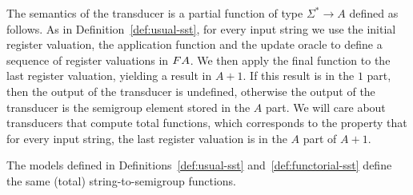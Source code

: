 The semantics of the transducer is a partial function of type 
$\Sigma^* \to A$ defined as follows. As in Definition~\ref{def:usual-sst}, for every input string we use  the initial register valuation, the application function and the update oracle to define a sequence of register valuations in $\functor A$. We then apply the final function to the last register valuation, yielding a result in $A+1$.  If this result is in the $1$ part, then the output of the transducer is undefined, otherwise the output of the transducer is the semigroup element stored in the $A$ part. We will care about transducers that compute total functions, which corresponds to the property  that for every input string, the last register valuation is in the $A$ part of $A+1$.

\begin{lemma}\label{lem:functorial-sst-complete}
    The models defined in Definitions~\ref{def:usual-sst} and~\ref{def:functorial-sst} define the same (total) string-to-semigroup functions.
\end{lemma}

